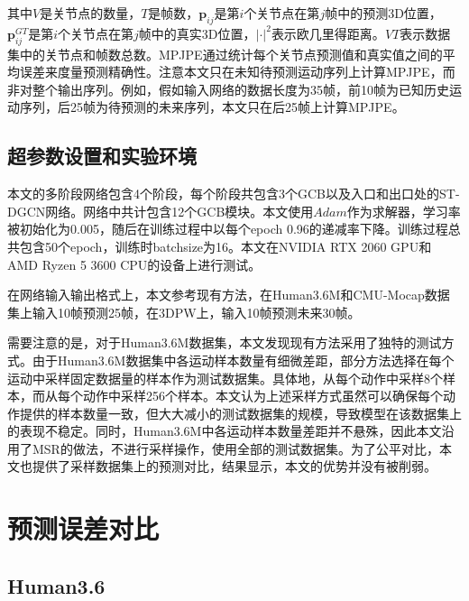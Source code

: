 其中$V$是关节点的数量，$T$是帧数，$\mathbf{p}_{ij}$是第$i$个关节点在第$j$帧中的预测3D位置，$\mathbf{p}^{GT}_{ij}$是第$i$个关节点在第$j$帧中的真实3D位置，$|\cdot|^2$表示欧几里得距离。$VT$表示数据集中的关节点和帧数总数。MPJPE通过统计每个关节点预测值和真实值之间的平均误差来度量预测精确性。注意本文只在未知待预测运动序列上计算MPJPE，而非对整个输出序列。例如，假如输入网络的数据长度为35帧，前10帧为已知历史运动序列，后25帧为待预测的未来序列，本文只在后25帧上计算MPJPE。

\subsection{超参数设置和实验环境}
本文的多阶段网络包含4个阶段，每个阶段共包含3个GCB以及入口和出口处的ST-DGCN网络。网络中共计包含12个GCB模块。本文使用$Adam$作为求解器，学习率被初始化为0.005，随后在训练过程中以每个epoch 0.96的递减率下降。训练过程总共包含50个epoch，训练时batchsize为16。本文在NVIDIA RTX 2060 GPU和AMD Ryzen 5 3600 CPU的设备上进行测试。

在网络输入输出格式上，本文参考现有方法，在Human3.6M和CMU-Mocap数据集上输入10帧预测25帧，在3DPW上，输入10帧预测未来30帧。

需要注意的是，对于Human3.6M数据集，本文发现现有方法采用了独特的测试方式。由于Human3.6M数据集中各运动样本数量有细微差距，部分方法选择在每个运动中采样固定数据量的样本作为测试数据集。具体地，\parencite{li2020dynamic, mao2019learning, martinez2017human}从每个动作中采样8个样本，而\parencite{mao2020history}从每个动作中采样256个样本。本文认为上述采样方式虽然可以确保每个动作提供的样本数量一致，但大大减小的测试数据集的规模，导致模型在该数据集上的表现不稳定。同时，Human3.6M中各运动样本数量差距并不悬殊，因此本文沿用了MSR\parencite{dang2021msr}的做法，不进行采样操作，使用全部的测试数据集。为了公平对比，本文也提供了采样数据集上的预测对比，结果显示，本文的优势并没有被削弱。



\section{预测误差对比}\label{section:prediction_error}
\subsection{Human3.6}

